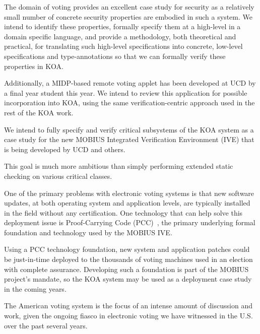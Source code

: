 \documentclass[times, 10pt, twocolumn]{article}
\begin{document}
The domain of voting provides an excellent case study for security as a
relatively small number of concrete security properties are embodied
in such a system.  We intend to identify these properties, formally
specify them at a high-level in a domain specific language, and
provide a methodology, both theoretical and practical, for translating
such high-level specifications into concrete, low-level specifications
and type-annotations so that we can formally verify these properties
in KOA.

Additionally, a MIDP-based remote voting applet has been developed at
UCD by a final year student this year.  We intend to review this
application for possible incorporation into KOA, using the same
verification-centric approach used in the rest of the KOA work.


We intend to fully specify and verify critical subsystems of the KOA
system as a case study for the new MOBIUS Integrated Verification
Environment (IVE) that is being developed by UCD and others.

This goal is much more ambitious than simply performing extended
static checking on various critical classes.


One of the primary problems with electronic voting systems is that new
software updates, at both operating system and application levels, are
typically installed in the field without any certification.  One
technology that can help solve this deployment issue is Proof-Carrying
Code (PCC)~\cite{Necula97}, the primary underlying formal foundation
and technology used by the MOBIUS IVE.

Using a PCC technology foundation, new system and application patches
could be just-in-time deployed to the thousands of voting machines
used in an election with complete assurance.  Developing such a
foundation is part of the MOBIUS project's mandate, so the KOA system
may be used as a deployment case study in the coming years.


The American voting system is the focus of an intense amount of
discussion and work, given the ongoing fiasco in electronic voting we
have witnessed in the U.S. over the past several years.
\end{document}
